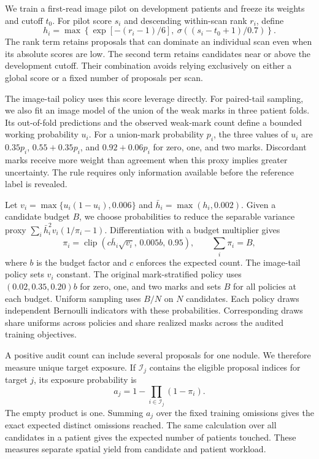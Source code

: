 We train a first-read image pilot on development patients and freeze its weights and cutoff $t_0$. For pilot score $s_i$ and descending within-scan rank $r_i$, define
\begin{equation}
 h_i=\max\!\left\{
     \exp[-(r_i-1)/6],\
     \sigma((s_i-t_0+1)/0.7)
 \right\}.
 \label{eq:leverage}
\end{equation}
The rank term retains proposals that can dominate an individual scan even when its absolute scores are low. The second term retains candidates near or above the development cutoff. Their combination avoids relying exclusively on either a global score or a fixed number of proposals per scan.

The image-tail policy uses this score leverage directly. For paired-tail sampling, we also fit an image model of the union of the weak marks in three patient folds. Its out-of-fold predictions and the observed weak-mark count define a bounded working probability $u_i$. For a union-mark probability $p_i$, the three values of $u_i$ are $0.35p_i$, $0.55+0.35p_i$, and $0.92+0.06p_i$ for zero, one, and two marks. Discordant marks receive more weight than agreement when this proxy implies greater uncertainty. The rule requires only information available before the reference label is revealed.

Let $v_i=\max\{u_i(1-u_i),0.006\}$ and $\bar h_i=\max(h_i,0.002)$. Given a candidate budget $B$, we choose probabilities to reduce the separable variance proxy $\sum_i \bar h_i^2 v_i(1/\pi_i-1)$. Differentiation with a budget multiplier gives
\begin{equation}
 \pi_i=\operatorname{clip}(c\bar h_i\sqrt{v_i},\,0.005b,\,0.95),
 \qquad \sum_i\pi_i=B,
 \label{eq:sampling}
\end{equation}
where $b$ is the budget factor and $c$ enforces the expected count. The image-tail policy sets $v_i$ constant. The original mark-stratified policy uses $(0.02,0.35,0.20)b$ for zero, one, and two marks and sets $B$ for all policies at each budget. Uniform sampling uses $B/N$ on $N$ candidates. Each policy draws independent Bernoulli indicators with these probabilities. Corresponding draws share uniforms across policies and share realized masks across the audited training objectives.

A positive audit count can include several proposals for one nodule. We therefore measure unique target exposure. If $\mathcal I_j$ contains the eligible proposal indices for target $j$, its exposure probability is
\begin{equation}
 a_j=1-\prod_{i\in\mathcal I_j}(1-\pi_i).
 \label{eq:exposure}
\end{equation}
The empty product is one. Summing $a_j$ over the fixed training omissions gives the exact expected distinct omissions reached. The same calculation over all candidates in a patient gives the expected number of patients touched. These measures separate spatial yield from candidate and patient workload.

